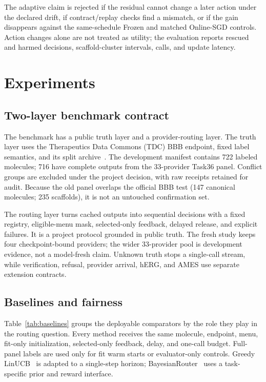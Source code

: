 \documentclass[sigconf,anonymous]{aamas}
\begin{document}
The adaptive claim is rejected if the residual cannot change a later action under the declared drift, if contract/replay checks find a mismatch, or if the gain disappears against the same-schedule Frozen and matched Online-SGD controls. Action changes alone are not treated as utility; the evaluation reports rescued and harmed decisions, scaffold-cluster intervals, calls, and update latency.

\section{Experiments}
\subsection{Two-layer benchmark contract}
The benchmark has a public truth layer and a provider-routing layer. The truth layer uses the Therapeutics Data Commons (TDC) BBB endpoint, fixed label semantics, and its split archive~\cite{huang2021tdc}. The development manifest contains 722 labeled molecules; 716 have complete outputs from the 33-provider Task36 panel. Conflict groups are excluded under the project decision, with raw receipts retained for audit. Because the old panel overlaps the official BBB test (147 canonical molecules; 235 scaffolds), it is not an untouched confirmation set.

The routing layer turns cached outputs into sequential decisions with a fixed registry, eligible-menu mask, selected-only feedback, delayed release, and explicit failures. It is a project protocol grounded in public truth. The fresh study keeps four checkpoint-bound providers; the wider 33-provider pool is development evidence, not a model-fresh claim. Unknown truth stops a single-call stream, while verification, refusal, provider arrival, hERG, and AMES use separate extension contracts.

\subsection{Baselines and fairness}
Table~\ref{tab:baselines} groups the deployable comparators by the role they play in the routing question. Every method receives the same molecule, endpoint, menu, fit-only initialization, selected-only feedback, delay, and one-call budget. Full-panel labels are used only for fit warm starts or evaluator-only controls. Greedy LinUCB~\cite{poon2026multillm} is adapted to a single-step horizon; BayesianRouter~\cite{wu2026rewardrouting} uses a task-specific prior and reward interface.
\end{document}
